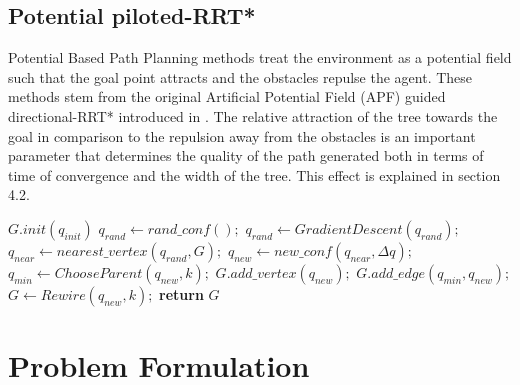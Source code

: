 \documentclass[runningheads]{llncs}
\begin{document}

\subsection{Potential piloted-RRT*}
Potential Based Path Planning methods treat the environment as a potential field such that the goal point attracts and the obstacles repulse the agent. These methods stem from the original Artificial Potential Field (APF) guided directional-RRT* introduced in \cite{potential}. The relative attraction of the tree towards the goal in comparison to the repulsion away from the obstacles is an important parameter that determines the quality of the path generated both in terms of time of convergence and the width of the tree. This effect is explained in section 4.2.

\begin{algorithm}
\caption{Potential Guided Directional-RRT* algorithm}\label{alg:PG-RRT}
\begin{algorithmic}[1]
\State $G.init(q_{init})$
\State $q_{rand}\gets rand\_conf();$
\State $q_{rand}\gets GradientDescent(q_{rand});$
\State $q_{near}\gets nearest\_vertex(q_{rand}, G);$
\State $q_{new}\gets new\_conf(q_{near}, \Delta q);$
\State $q_{min}\gets ChooseParent(q_{new},k);$
\State $G.add\_vertex(q_{new});$
\State $G.add\_edge(q_{min},q_{new});$
\State $G\gets Rewire(q_{new},k);$
\EndIf
\EndFor
\State \textbf{return} $G$
\EndProcedure
\end{algorithmic}
\end{algorithm}


\section{{Problem Formulation}}
\vspace{-1mm}
\end{document}
